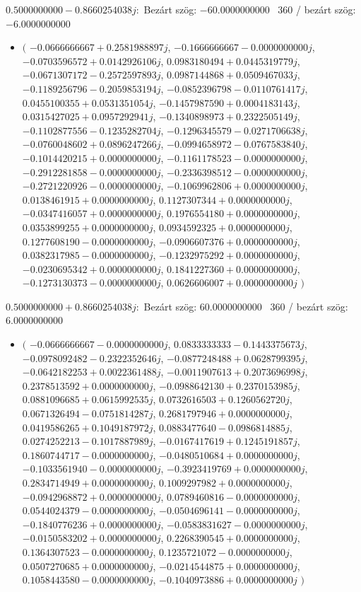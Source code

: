 \documentclass[14pt,a4paper]{article}
\begin{document}
$0.5000000000-0.8660254038j$:\
Bezárt szög: $-60.0000000000$ \
360 / bezárt szög: $-6.0000000000$\
\begin{itemize}
\item
$\big($
$-0.0666666667+0.2581988897j$, $-0.1666666667-0.0000000000j$, $-0.0703596572+0.0142926106j$, $0.0983180494+0.0445319779j$, $-0.0671307172-0.2572597893j$, $0.0987144868+0.0509467033j$, $-0.1189256796-0.2059853194j$, $-0.0852396798-0.0110761417j$, $0.0455100355+0.0531351054j$, $-0.1457987590+0.0004183143j$, $0.0315427025+0.0957292941j$, $-0.1340898973+0.2322505149j$, $-0.1102877556-0.1235282704j$, $-0.1296345579-0.0271706638j$, $-0.0760048602+0.0896247266j$, $-0.0994658972-0.0767583840j$, $-0.1014420215+0.0000000000j$, $-0.1161178523-0.0000000000j$, $-0.2912281858-0.0000000000j$, $-0.2336398512-0.0000000000j$, $-0.2721220926-0.0000000000j$, $-0.1069962806+0.0000000000j$, $0.0138461915+0.0000000000j$, $0.1127307344+0.0000000000j$, $-0.0347416057+0.0000000000j$, $0.1976554180+0.0000000000j$, $0.0353899255+0.0000000000j$, $0.0934592325+0.0000000000j$, $0.1277608190-0.0000000000j$, $-0.0906607376+0.0000000000j$, $0.0382317985-0.0000000000j$, $-0.1232975292+0.0000000000j$, $-0.0230695342+0.0000000000j$, $0.1841227360+0.0000000000j$, $-0.1273130373-0.0000000000j$, $0.0626606007+0.0000000000j$
$\big)$
\end{itemize}
$0.5000000000+0.8660254038j$:\
Bezárt szög: $60.0000000000$ \
360 / bezárt szög: $6.0000000000$\
\begin{itemize}
\item
$\big($
$-0.0666666667-0.0000000000j$, $0.0833333333-0.1443375673j$, $-0.0978092482-0.2322352646j$, $-0.0877248488+0.0628799395j$, $-0.0642182253+0.0022361488j$, $-0.0011907613+0.2073696998j$, $0.2378513592+0.0000000000j$, $-0.0988642130+0.2370153985j$, $0.0881096685+0.0615992535j$, $0.0732616503+0.1260562720j$, $0.0671326494-0.0751814287j$, $0.2681797946+0.0000000000j$, $0.0419586265+0.1049187972j$, $0.0883477640-0.0986814885j$, $0.0274252213-0.1017887989j$, $-0.0167417619+0.1245191857j$, $0.1860744717-0.0000000000j$, $-0.0480510684+0.0000000000j$, $-0.1033561940-0.0000000000j$, $-0.3923419769+0.0000000000j$, $0.2834714949+0.0000000000j$, $0.1009297982+0.0000000000j$, $-0.0942968872+0.0000000000j$, $0.0789460816-0.0000000000j$, $0.0544024379-0.0000000000j$, $-0.0504696141-0.0000000000j$, $-0.1840776236+0.0000000000j$, $-0.0583831627-0.0000000000j$, $-0.0150583202+0.0000000000j$, $0.2268390545+0.0000000000j$, $0.1364307523-0.0000000000j$, $0.1235721072-0.0000000000j$, $0.0507270685+0.0000000000j$, $-0.0214544875+0.0000000000j$, $0.1058443580-0.0000000000j$, $-0.1040973886+0.0000000000j$
$\big)$
\end{itemize}
\end{document}
